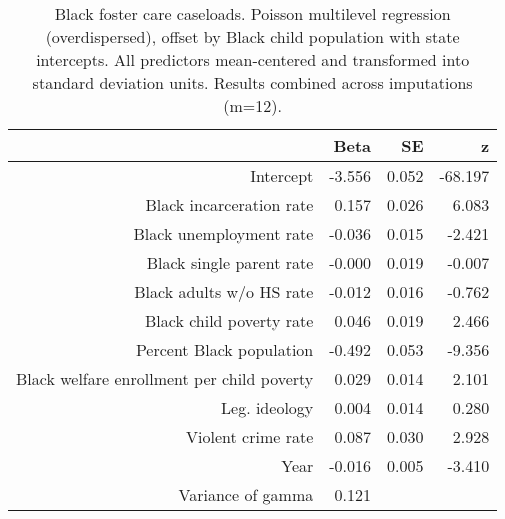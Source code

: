 \begin{table}[ht]
\centering
\caption{Black foster care caseloads. Poisson multilevel regression (overdispersed), 
             offset by Black child population with state intercepts. 
             All predictors mean-centered and transformed into standard deviation units.
             Results combined across imputations (m=12).} 
\label{b.c.tab}
\begin{tabular}{rrrr}
  \hline
 & Beta & SE & z \\ 
  \hline
Intercept & -3.556 & 0.052 & -68.197 \\ 
  Black incarceration rate & 0.157 & 0.026 & 6.083 \\ 
  Black unemployment rate & -0.036 & 0.015 & -2.421 \\ 
  Black single parent rate & -0.000 & 0.019 & -0.007 \\ 
  Black adults w/o HS rate & -0.012 & 0.016 & -0.762 \\ 
  Black child poverty rate & 0.046 & 0.019 & 2.466 \\ 
  Percent Black population & -0.492 & 0.053 & -9.356 \\ 
  Black welfare enrollment per child poverty & 0.029 & 0.014 & 2.101 \\ 
  Leg. ideology & 0.004 & 0.014 & 0.280 \\ 
  Violent crime rate & 0.087 & 0.030 & 2.928 \\ 
  Year & -0.016 & 0.005 & -3.410 \\ 
  Variance of gamma & 0.121 &  &  \\ 
   \hline
\end{tabular}
\end{table}
